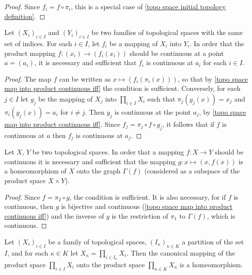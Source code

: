 \begin{proof}
Since $f_i=f\circ\pi_i$, this is a special case of \cref{topo space initial topology definition}.
\end{proof}
\begin{corollary}\label{topological product map continuous iff}
Let $(X_i)_{i\in I}$ and $(Y_i)_{i\in I}$ be two families of topological spaces with tke same set of indices. For each $i\in I$, let $f_i$ be a mapping of $X_i$ into $Y_i$. In order that the product mapping $f:(x_i)\to(f_i(x_i))$ should be continuous at a point $a=(a_i)$, it is necessary and sufficient that $f_i$ is continuous at $a_i$ for each $i\in I$.
\end{corollary}
\begin{proof}
The map $f$ can be written as $x\mapsto(f_i(\pi_i(x)))$, so that by \cref{topo space map into product continuous iff} the condition is sufficient. Conversely, for each $j\in I$ let $g_j$ be the mapping of $X_j$ into $\prod_{i\in I}X_i$ such that $\pi_j(g_j(x))=x_j$ and $\pi_i(g_j(x))=a_i$ for $i\neq j$. Then $g_j$ is continuous at the point $a_j$, by \cref{topo space map into product continuous iff}. Since $f_j=\pi_j\circ f\circ g_j$, it follows that if $f$ is continuous at $a$ then $f_j$ is continuous at $a_j$.
\end{proof}
\begin{corollary}
Let $X$, $Y$ be two topological spaces. In order that a mapping $f:X\to Y$ should be continuous it is necessary and sufficient that the mapping $g:x\mapsto(x,f(x))$ is a homeomorphism of $X$ onto the graph $\Gamma(f)$ (considered as a subspace of the product space $X\times Y$).
\end{corollary}
\begin{proof}
Since $f=\pi_2\circ g$, the condition is sufficient. It is also necessary, for if $f$ is continuous, then $g$ is bijective and continuous (\cref{topo space map into product continuous iff}) and the inverse of $g$ is the restriction of $\pi_1$ to $\Gamma(f)$, which is continuous.
\end{proof}
\begin{proposition}
Let $(X_i)_{i\in I}$ be a family of topological spaces, $(I_\kappa)_{\kappa\in K}$ a partition of the set $I$, and for each $\kappa\in K$ let $X_\kappa=\prod_{i\in I_\kappa}X_i$. Then the canonical mapping of the product space $\prod_{i\in I}X_i$ onto the product space $\prod_{\kappa\in K}X_\kappa$ is a homeomorphism.
\end{proposition}
